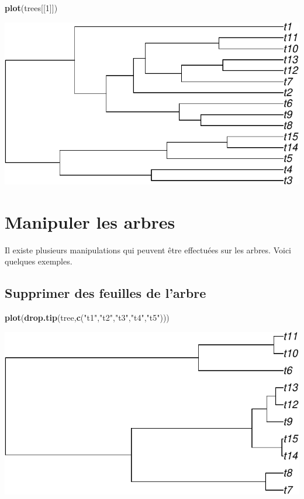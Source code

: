 \documentclass[
]{book}
\newenvironment{Shaded}{\begin{snugshade}}{\end{snugshade}}
\newcommand{\DecValTok}[1]{\textcolor[rgb]{0.00,0.00,0.81}{#1}}
\newcommand{\FunctionTok}[1]{\textcolor[rgb]{0.13,0.29,0.53}{\textbf{#1}}}
\newcommand{\NormalTok}[1]{#1}
\newcommand{\StringTok}[1]{\textcolor[rgb]{0.31,0.60,0.02}{#1}}
\begin{document}
\begin{Shaded}
\begin{Highlighting}[]
\FunctionTok{plot}\NormalTok{(trees[[}\DecValTok{1}\NormalTok{]])}
\end{Highlighting}
\end{Shaded}

\includegraphics{pcm-workshop_files/figure-latex/multiPhylo manipulation-1.pdf}

\section{Manipuler les arbres}\label{manipuler-les-arbres}

Il existe plusieurs manipulations qui peuvent être effectuées sur les arbres. Voici quelques exemples.

\subsection{Supprimer des feuilles de l'arbre}\label{supprimer-des-feuilles-de-larbre}

\begin{Shaded}
\begin{Highlighting}[]
\FunctionTok{plot}\NormalTok{(}\FunctionTok{drop.tip}\NormalTok{(tree,}\FunctionTok{c}\NormalTok{(}\StringTok{"t1"}\NormalTok{,}\StringTok{"t2"}\NormalTok{,}\StringTok{"t3"}\NormalTok{,}\StringTok{"t4"}\NormalTok{,}\StringTok{"t5"}\NormalTok{)))}
\end{Highlighting}
\end{Shaded}

\includegraphics{pcm-workshop_files/figure-latex/Drop tips-1.pdf}
\end{document}
